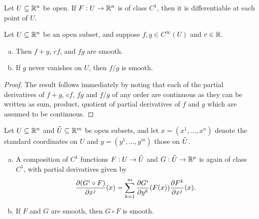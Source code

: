 \documentclass[11pt,a4paper]{article}
\begin{document}
\begin{proposition}
Let $U\subseteq \mathbb{R}^n$ be open. If $F:U\rightarrow \mathbb{R}^n$ is of class $C^1$, then it is differentiable at each point of $U$.
\end{proposition}


\begin{proposition}
Let $U\subseteq \mathbb{R}^n$ be an open subset, and suppose $f,g\in C^\infty(U)$ and $c\in \mathbb{R}$.
\begin{enumerate}[(a)]
    \item Then $f+g$, $cf$, and $fg$ are smooth.
    \item If $g$ never vanishes on $U$, then $f/g$ is smooth.
\end{enumerate}
\end{proposition}

\begin{proof}
The result follows immediately by noting that each of the partial derivatives of $f+g$, $cf$, $fg$ and $f/g$ of any order are continuous as they can be written as sum, product, quotient of partial derivatives of $f$ and $g$ which are assumed to be continuous.
\end{proof}

\begin{proposition} \label{prop:chain_rule_partial_derivatives}
Let $U\subseteq \mathbb{R}^n$ and $\Tilde{U}\subseteq \mathbb{R}^m$ be open subsets, and let $x = (x^1,\ldots,x^n)$ denote the standard coordinates on $U$ and $y = (y^1,\ldots,y^m)$ those on $\Tilde{U}$.
\begin{enumerate}[(a)]
    \item A composition of $C^1$ functions $F:U\rightarrow \Tilde{U}$ and $G:\Tilde{U}\rightarrow \mathbb{R}^p$ is again of class $C^1$, with partial derivatives given by
    \begin{equation*}
        \dfrac{\partial (G^i\circ F)}{\partial x^{j}}(x) = \sum_{k=1}^m \dfrac{\partial G^i}{\partial y^k}(F(x)) \dfrac{\partial F^k}{\partial x^{j}}(x).
    \end{equation*}
    \item If $F$ and $G$ are smooth, then $G\circ F$ is smooth.
\end{enumerate}
\end{proposition}
\end{document}
